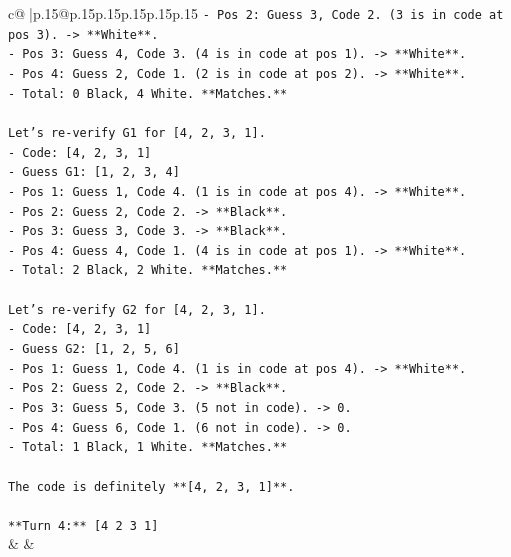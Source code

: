 \documentclass{article}
\begin{document}
{\begin{supertabular}{c@{$\;$}|p{.15\linewidth}@{}p{.15\linewidth}p{.15\linewidth}p{.15\linewidth}p{.15\linewidth}p{.15\linewidth}}
{{{\texttt{{-} Pos 2: Guess 3, Code 2. (3 is in code at pos 3). {-}> **White**.} \\
\texttt{{-} Pos 3: Guess 4, Code 3. (4 is in code at pos 1). {-}> **White**.} \\
\texttt{{-} Pos 4: Guess 2, Code 1. (2 is in code at pos 2). {-}> **White**.} \\
\texttt{{-} Total: 0 Black, 4 White. **Matches.**} \\
\\ 
\texttt{Let's re{-}verify G1 for {[}4, 2, 3, 1{]}.} \\
\texttt{{-} Code: {[}4, 2, 3, 1{]}} \\
\texttt{{-} Guess G1: {[}1, 2, 3, 4{]}} \\
\texttt{{-} Pos 1: Guess 1, Code 4. (1 is in code at pos 4). {-}> **White**.} \\
\texttt{{-} Pos 2: Guess 2, Code 2. {-}> **Black**.} \\
\texttt{{-} Pos 3: Guess 3, Code 3. {-}> **Black**.} \\
\texttt{{-} Pos 4: Guess 4, Code 1. (4 is in code at pos 1). {-}> **White**.} \\
\texttt{{-} Total: 2 Black, 2 White. **Matches.**} \\
\\ 
\texttt{Let's re{-}verify G2 for {[}4, 2, 3, 1{]}.} \\
\texttt{{-} Code: {[}4, 2, 3, 1{]}} \\
\texttt{{-} Guess G2: {[}1, 2, 5, 6{]}} \\
\texttt{{-} Pos 1: Guess 1, Code 4. (1 is in code at pos 4). {-}> **White**.} \\
\texttt{{-} Pos 2: Guess 2, Code 2. {-}> **Black**.} \\
\texttt{{-} Pos 3: Guess 5, Code 3. (5 not in code). {-}> 0.} \\
\texttt{{-} Pos 4: Guess 6, Code 1. (6 not in code). {-}> 0.} \\
\texttt{{-} Total: 1 Black, 1 White. **Matches.**} \\
\\ 
\texttt{The code is definitely **{[}4, 2, 3, 1{]}**.} \\
\\ 
\texttt{**Turn 4:** {[}4 2 3 1{]}} \\
            }
        }
    }
    & & \\ \\


\end{supertabular}}
\end{document}
